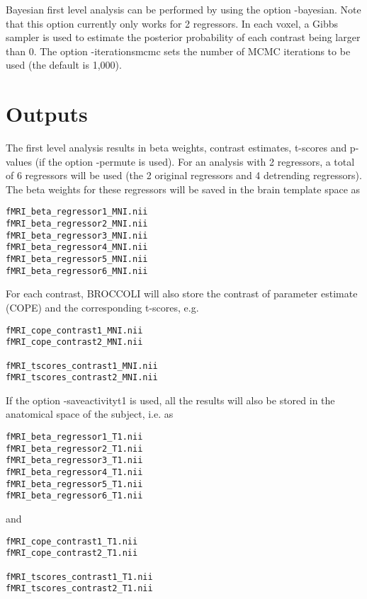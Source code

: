 Bayesian first level analysis can be performed by using the option -bayesian.  Note that this option currently only works for 2 regressors. In each voxel, a Gibbs sampler is used to estimate the posterior probability of each contrast being larger than 0. The option -iterationsmcmc sets the number of MCMC iterations to be used (the default is 1,000).

\section{Outputs}

The first level analysis results in beta weights, contrast estimates, t-scores and p-values (if the option -permute is used). For an analysis with 2 regressors, a total of 6 regressors will be used (the 2 original regressors and 4 detrending regressors). The beta weights for these regressors will be saved in the brain template space as

\begin{verbatim}
fMRI_beta_regressor1_MNI.nii 
fMRI_beta_regressor2_MNI.nii 
fMRI_beta_regressor3_MNI.nii 
fMRI_beta_regressor4_MNI.nii 
fMRI_beta_regressor5_MNI.nii 
fMRI_beta_regressor6_MNI.nii 
\end{verbatim}

For each contrast, BROCCOLI will also store the contrast of parameter estimate (COPE) and the corresponding t-scores, e.g.

\begin{verbatim}
fMRI_cope_contrast1_MNI.nii  
fMRI_cope_contrast2_MNI.nii  

fMRI_tscores_contrast1_MNI.nii
fMRI_tscores_contrast2_MNI.nii
\end{verbatim}

If the option -saveactivityt1 is used, all the results will also be stored in the anatomical space of the subject, i.e. as

\begin{verbatim}
fMRI_beta_regressor1_T1.nii 
fMRI_beta_regressor2_T1.nii 
fMRI_beta_regressor3_T1.nii 
fMRI_beta_regressor4_T1.nii 
fMRI_beta_regressor5_T1.nii 
fMRI_beta_regressor6_T1.nii 
\end{verbatim}

and

\begin{verbatim}
fMRI_cope_contrast1_T1.nii  
fMRI_cope_contrast2_T1.nii  

fMRI_tscores_contrast1_T1.nii
fMRI_tscores_contrast2_T1.nii
\end{verbatim}

